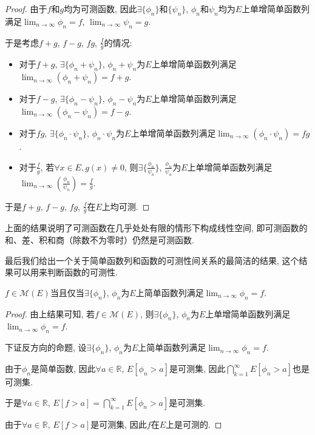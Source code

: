 \documentclass[theorem=false,mathfont=none,openany,sub3section]{easybook}
\begin{document}
\begin{proof}
  由于$f$和$g$均为可测函数, 因此$\exists \{\phi_n\}$和$\{\psi_n\}$, $\phi_n$和$\psi_n$均为$E$上单增简单函数列满足$\lim_{n \to \infty} \phi_n = f$, $\lim_{n \to \infty} \psi_n = g$.\par
  于是考虑$f+g$, $f-g$, $fg$, $\frac{f}{g}$的情况:\par
  \begin{itemize}
    \item 对于$f+g$, $\exists \{\phi_n+\psi_n\}$, $\phi_n+\psi_n$为$E$上单增简单函数列满足$\lim_{n \to \infty} (\phi_n+\psi_n) = f+g$.\par
    \item 对于$f-g$, $\exists \{\phi_n-\psi_n\}$, $\phi_n-\psi_n$为$E$上单增简单函数列满足$\lim_{n \to \infty} (\phi_n-\psi_n) = f-g$.\par
    \item 对于$fg$, $\exists \{\phi_n\cdot\psi_n\}$, $\phi_n\cdot\psi_n$为$E$上单增简单函数列满足$\lim_{n \to \infty} (\phi_n\cdot\psi_n) = fg$.\par
    \item 对于$\frac{f}{g}$, 若$\forall x\in E, g(x)\neq 0$, 则$\exists \{\frac{\phi_n}{\psi_n}\}$, $\frac{\phi_n}{\psi_n}$为$E$上单增简单函数列满足$\lim_{n \to \infty} (\frac{\phi_n}{\psi_n}) = \frac{f}{g}$.\par
  \end{itemize}
  于是$f+g$, $f-g$, $fg$, $\frac{f}{g}$在$E$上均可测.\par
\end{proof}

\begin{remark}
  上面的结果说明了可测函数在几乎处处有限的情形下构成线性空间, 即可测函数的和、差、积和商（除数不为零时）仍然是可测函数.\par
\end{remark}

最后我们给出一个关于简单函数列和函数的可测性间关系的最简洁的结果, 这个结果可以用来判断函数的可测性.\par

\begin{theorem}
  $f\in \mathcal{M}(E)$当且仅当$\exists \{\phi_n\}$, $\phi_n$为$E$上简单函数列满足$\lim_{n \to \infty} \phi_n = f$.\par
\end{theorem}

\begin{proof}
  由上结果可知, 若$f\in \mathcal{M}(E)$, 则$\exists \{\phi_n\}$, $\phi_n$为$E$上单增简单函数列满足$\lim_{n \to \infty} \phi_n = f$.\par
  下证反方向的命题, 设$\exists \{\phi_n\}$, $\phi_n$为$E$上简单函数列满足$\lim_{n \to \infty} \phi_n = f$.\par
  由于$\phi_n$是简单函数, 因此$\forall a\in \mathbb{R}$, $E[\phi_n>a]$是可测集, 因此$\bigcap_{k=1}^{\infty}E[\phi_n>a]$也是可测集.\par
  于是$\forall a\in \mathbb{R}$, $E[f>a] = \bigcap_{k=1}^{\infty}E[\phi_n>a]$是可测集.\par
  由于$\forall a\in \mathbb{R}$, $E[f>a]$是可测集, 因此$f$在$E$上是可测的.\par
\end{proof}
\end{document}
